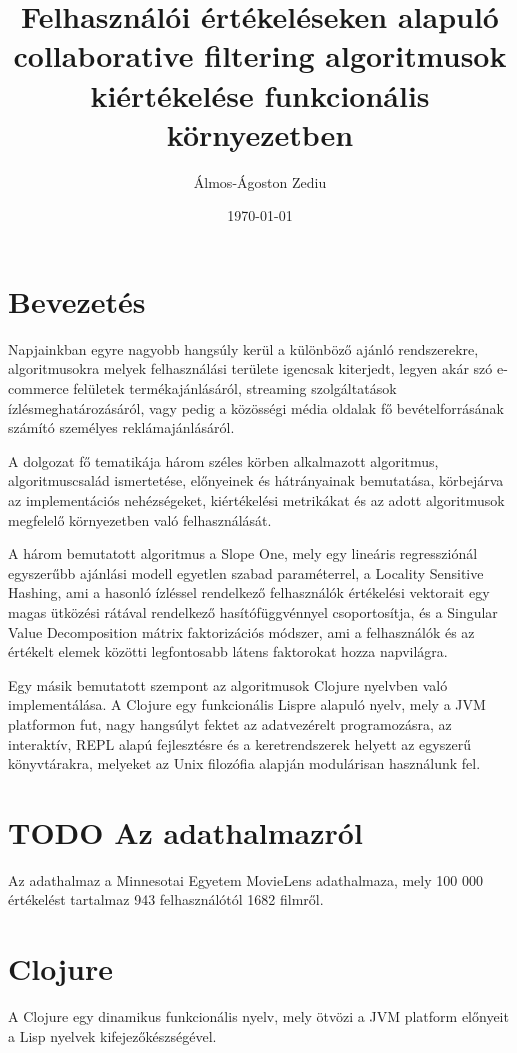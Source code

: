 \documentclass[final, 12pt] {ubb_dolgozat}{book}
\author{Álmos-Ágoston Zediu}
\date{\today}
\title{Felhasználói értékeléseken alapuló collaborative filtering algoritmusok kiértékelése funkcionális környezetben}
\begin{document}
\maketitle
\tableofcontents


\chapter{Bevezetés}
\label{sec:org258b10f}
Napjainkban egyre nagyobb hangsúly kerül a különböző ajánló rendszerekre, algoritmusokra melyek felhasználási területe
igencsak kiterjedt, legyen akár szó e-commerce felületek termékajánlásáról, streaming szolgáltatások ízlésmeghatározásáról,
vagy pedig a közösségi média oldalak fő bevételforrásának számító személyes reklámajánlásáról.

A dolgozat fő tematikája három széles körben alkalmazott algoritmus, algoritmuscsalád ismertetése, előnyeinek és hátrányainak
bemutatása, körbejárva az implementációs nehézségeket, kiértékelési metrikákat és az adott algoritmusok megfelelő környezetben
való felhasználását.

A három bemutatott algoritmus a Slope One, mely egy lineáris regressziónál egyszerűbb ajánlási modell egyetlen
szabad paraméterrel, a Locality Sensitive Hashing, ami a hasonló ízléssel rendelkező felhasználók értékelési vektorait egy magas ütközési
rátával rendelkező hasítófüggvénnyel csoportosítja, és a Singular Value Decomposition mátrix faktorizációs módszer, ami a felhasználók
és az értékelt elemek közötti legfontosabb látens faktorokat hozza napvilágra.

Egy másik bemutatott szempont az algoritmusok Clojure nyelvben való implementálása.  A Clojure egy funkcionális Lispre alapuló nyelv, mely a JVM
platformon fut, nagy hangsúlyt fektet az adatvezérelt programozásra, az interaktív, REPL alapú fejlesztésre és a keretrendszerek helyett
az egyszerű könyvtárakra, melyeket az Unix filozófia alapján modulárisan használunk fel.

\chapter{{\bfseries\sffamily TODO} Az adathalmazról}
\label{sec:orge493ea2}
Az adathalmaz a Minnesotai Egyetem MovieLens adathalmaza, mely 100 000 értékelést tartalmaz 943 felhasználótól
1682 filmről. \citep{harperMovieLensDatasetsHistory2016}
\chapter{Clojure}
\label{sec:orgb838d60}
A Clojure egy dinamikus funkcionális nyelv, mely ötvözi a JVM platform előnyeit a Lisp nyelvek
kifejezőkészségével.
\end{document}

